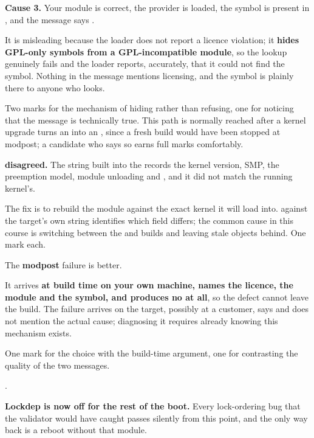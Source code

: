 \textbf{Cause 3.} Your module is correct, the provider is loaded, the symbol is present in
, and the message says .

It is misleading because the loader does not report a licence violation; it \textbf{hides GPL-only
symbols from a GPL-incompatible module}, so the lookup genuinely fails and the loader reports,
accurately, that it could not find the symbol. Nothing in the message mentions licensing, and the
symbol is plainly there to anyone who looks.

Two marks for the mechanism of hiding rather than refusing, one for noticing that the message is
technically true. This path is normally reached after a kernel upgrade turns an 
into an , since a fresh build would have been stopped at modpost; a
candidate who says so earns full marks comfortably.

\textbf{ disagreed.} The string built into the  records the kernel version,
SMP, the preemption model, module unloading and , and it did not match the running
kernel's.

The fix is to rebuild the module against the exact kernel it will load into.  against the target's own string identifies which field differs; the common cause
in this course is switching between the  and  builds and leaving
stale objects behind. One mark each.

The \textbf{modpost} failure is better.

It arrives \textbf{at build time on your own machine, names the licence, the module and the symbol,
and produces no  at all}, so the defect cannot leave the build. The  failure
arrives on the target, possibly at a customer, says  and does not mention the
actual cause; diagnosing it requires already knowing this mechanism exists.

One mark for the choice with the build-time argument, one for contrasting the quality of the two
messages.

.

\textbf{Lockdep is now off for the rest of the boot.} Every lock-ordering bug that the validator
would have caught passes silently from this point, and the only way back is a reboot without that
module.

